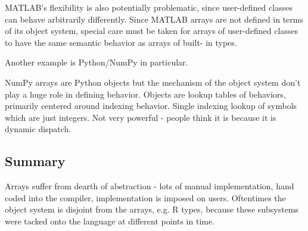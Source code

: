 \documentclass[preprint]{sigplanconf}
\newcommand{\MATLAB}{\textsc{MATLAB}}
\newcommand{\Mathematica}{\textit{Mathematica}}
\newcommand{\code}[1]{\texttt{#1}}
\begin{document}
\begin{enumerate}
\MATLAB's flexibility is also potentially problematic, since user-defined
classes can behave arbitrarily differently. Since \MATLAB{} arrays are not
defined in terms of its object system, special care must be taken for arrays
of user-defined classes to have the same semantic behavior as arrays of built-
in types.


%

Another example is Python/NumPy in particular.

NumPy arrays are Python objects but the mechanism of the object system don't
play a huge role in defining behavior. Objects are lookup tables of behaviors,
primarily centered around indexing behavior. Single indexing lookup of symbols
which are just integers. Not very powerful - people think it is because it is
dynamic dispatch. %


\end{enumerate}

\subsection{Summary}

Arrays suffer from dearth of abstraction - lots of manual implementation, hand
coded into the compiler, implementation is imposed on users. Oftentimes the
object system is disjoint from the arrays, e.g. R types, because these
subsystems were tacked onto the language at different points in time.
\end{document}
